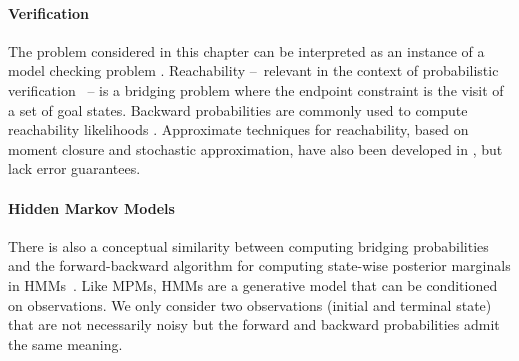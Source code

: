 \paragraph{Verification}
The problem considered in this chapter can be interpreted as an
instance of a model checking problem \parencite{brim2013model,BENTRIOU2021191}.
Reachability --~relevant in the context of probabilistic verification
\parencite{bortolussi2014stochastic,neupane2019stamina}~-- is a
bridging problem where the endpoint constraint is the visit of a set
of goal states.
Backward probabilities are commonly used to compute reachability
likelihoods \parencite{amparore2013backward,zapreev2006safe}.
Approximate techniques for reachability, based on moment closure and
stochastic approximation, have also been developed in
\parencite{bortolussi2014stochastic,Bortolussi18infcomp}, but lack
error guarantees.

\paragraph{Hidden Markov Models}
There is also a conceptual similarity between computing bridging
probabilities and the forward-backward algorithm for computing
state-wise posterior marginals in
\acfp{HMM}~\parencite{rabiner1986introduction}. Like \acp{MPM},
\acp{HMM} are a generative model that can be conditioned on
observations. We only consider two observations (initial and terminal
state) that are not necessarily noisy but the forward and backward
probabilities admit the same meaning.

